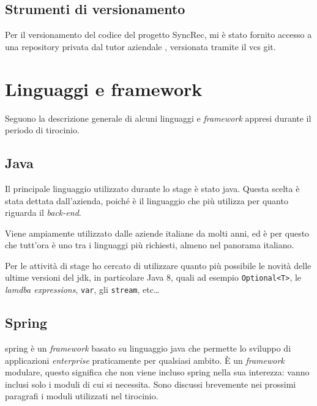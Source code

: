 \subsection{Strumenti di versionamento}

Per il versionamento del codice del progetto SyncRec, mi è stato fornito accesso a una \gls{repository} privata dal tutor aziendale \fabio, versionata tramite il \gls{vcs} \gls{git}.

\section{Linguaggi e framework}

Seguono la descrizione generale di alcuni linguaggi e \textit{framework} appresi durante il periodo di tirocinio.

\subsection{Java} Il principale linguaggio utilizzato durante lo stage è stato \gls{java}. Questa scelta è stata dettata dall'azienda, poiché è il linguaggio che più utilizza per quanto riguarda il \textit{back-end}.

Viene ampiamente utilizzato dalle aziende italiane da molti anni, ed è per questo che tutt'ora è uno tra i linguaggi più richiesti, almeno nel panorama italiano.

Per le attività di stage ho cercato di utilizzare quanto più possibile le novità delle ultime versioni del \gls{jdk}, in particolare Java 8, quali ad esempio \texttt{Optional<T>}, le \textit{lamdba expressions}, \texttt{var}, gli \texttt{stream}, etc\dots

\subsection{Spring}

\gls{spring} è un \textit{framework} basato su linguaggio \gls{java} che permette lo sviluppo di applicazioni \textit{enterprise} praticamente per qualsiasi ambito.
È un \textit{framework} modulare, questo significa che non viene incluso \gls{spring} nella sua interezza: vanno inclusi solo i moduli di cui si necessita. Sono discussi brevemente nei prossimi paragrafi i moduli utilizzati nel tirocinio.

